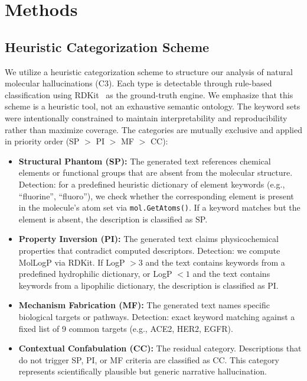 \section{Methods}
\label{sec:methods}

\subsection{Heuristic Categorization Scheme}
We utilize a heuristic categorization scheme to structure our analysis of natural molecular hallucinations (C3). Each type is detectable through rule-based classification using RDKit~\cite{landrum2016rdkit} as the ground-truth engine. We emphasize that this scheme is a heuristic tool, not an exhaustive semantic ontology. The keyword sets were intentionally constrained to maintain interpretability and reproducibility rather than maximize coverage. The categories are mutually exclusive and applied in priority order (SP $>$ PI $>$ MF $>$ CC):

\begin{itemize}
    \item \textbf{Structural Phantom (SP):} The generated text references chemical elements or functional groups that are absent from the molecular structure. Detection: for a predefined heuristic dictionary of element keywords (e.g., ``fluorine'', ``fluoro''), we check whether the corresponding element is present in the molecule's atom set via \texttt{mol.GetAtoms()}. If a keyword matches but the element is absent, the description is classified as SP.
    \item \textbf{Property Inversion (PI):} The generated text claims physicochemical properties that contradict computed descriptors. Detection: we compute MolLogP via RDKit. If LogP $> 3$ and the text contains keywords from a predefined hydrophilic dictionary, or LogP $< 1$ and the text contains keywords from a lipophilic dictionary, the description is classified as PI.
    \item \textbf{Mechanism Fabrication (MF):} The generated text names specific biological targets or pathways. Detection: exact keyword matching against a fixed list of 9 common targets (e.g., ACE2, HER2, EGFR).
    \item \textbf{Contextual Confabulation (CC):} The residual category. Descriptions that do not trigger SP, PI, or MF criteria are classified as CC. This category represents scientifically plausible but generic narrative hallucination.
\end{itemize}

